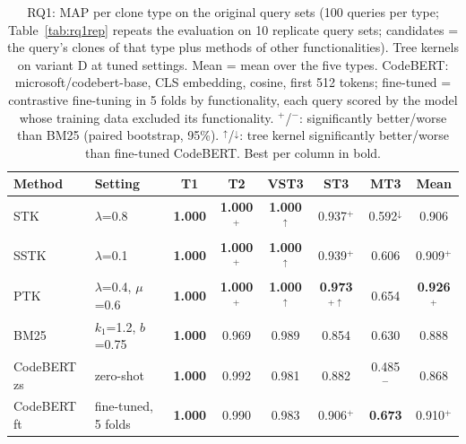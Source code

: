 \begin{table}[t]
\centering
\caption{RQ1: MAP per clone type on the original query sets (100 queries per type; Table~\ref{tab:rq1rep} repeats the evaluation on 10 replicate query sets; candidates = the query's clones of that type plus methods of other functionalities). Tree kernels on variant D at tuned settings. Mean = mean over the five types. CodeBERT: microsoft/codebert-base, CLS embedding, cosine, first 512 tokens; fine-tuned = contrastive fine-tuning in 5 folds by functionality, each query scored by the model whose training data excluded its functionality. $^{+}$/$^{-}$: significantly better/worse than BM25 (paired bootstrap, 95\%). $^{\uparrow}$/$^{\downarrow}$: tree kernel significantly better/worse than fine-tuned CodeBERT. Best per column in bold.}
\label{tab:rq1}
\small
\begin{tabular}{llcccccc}
\toprule
Method & Setting & T1 & T2 & VST3 & ST3 & MT3 & Mean \\
\midrule
STK & $\lambda$=0.8 & \textbf{1.000} & \textbf{1.000}$^{+}$ & \textbf{1.000}$^{\uparrow}$ & 0.937$^{+}$ & 0.592$^{\downarrow}$ & 0.906 \\
SSTK & $\lambda$=0.1 & \textbf{1.000} & \textbf{1.000}$^{+}$ & \textbf{1.000}$^{\uparrow}$ & 0.939$^{+}$ & 0.606 & 0.909$^{+}$ \\
PTK & $\lambda$=0.4, $\mu$=0.6 & \textbf{1.000} & \textbf{1.000}$^{+}$ & \textbf{1.000}$^{\uparrow}$ & \textbf{0.973}$^{+\uparrow}$ & 0.654 & \textbf{0.926}$^{+}$ \\
\midrule
BM25 & $k_1$=1.2, $b$=0.75 & \textbf{1.000} & 0.969 & 0.989 & 0.854 & 0.630 & 0.888 \\
CodeBERT zs & zero-shot & \textbf{1.000} & 0.992 & 0.981 & 0.882 & 0.485$^{-}$ & 0.868 \\
CodeBERT ft & fine-tuned, 5 folds & \textbf{1.000} & 0.990 & 0.983 & 0.906$^{+}$ & \textbf{0.673} & 0.910$^{+}$ \\
\bottomrule
\end{tabular}
\end{table}
